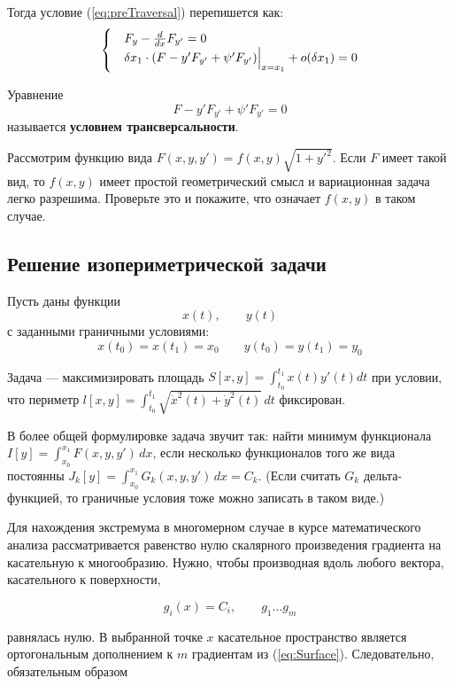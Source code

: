 \documentclass[12pt]{article}
\begin{document}
			Тогда условие (\ref{eq:preTraversal}) перепишется как:
			$$
				\begin{cases}
					&F_y - \frac{d}{dx} F_{y'} = 0 \\
					&\delta x_1 \cdot (F - y'F_{y'} + \psi' F_{y'})\Big|_{x=x_1}^{} + o(\delta x_1) = 0
				\end{cases} 
			$$

			Уравнение
			$$F - y' F_{y'} + \psi' F_{y'} = 0$$
			называется \textbf{условием трансверсальности}.


			\exc Рассмотрим функцию вида $F(x, y, y') = f(x,y) \sqrt{1+y'^2}$. Если $F$ имеет такой вид, то
			$f(x,y)$ имеет простой геометрический смысл и вариационная задача легко разрешима. Проверьте это
			и покажите, что означает $f(x,y)$ в таком случае.

	\subsection{Решение изопериметрической задачи}


		Пусть даны функции 
		$$x(t),\qquad y(t)$$
		с заданными граничными условиями:
		$$x(t_0) = x(t_1) = x_0 \qquad y(t_0) = y(t_1) = y_0$$

		Задача --- максимизировать площадь $S[x,y] = \int_{t_0}^{t_1}x(t)y'(t) dt$ при условии, что периметр
		$l[x,y] = \int_{t_0}^{t_1} \sqrt{\dot{x}^2(t) + \dot{y}^2(t)}\,dt$ фиксирован.

		В более общей формулировке задача звучит так: найти минимум функционала
		$I[y] = \int_{x_0}^{x_1} F(x,y,y')\,dx$, если несколько функционалов того же вида постоянны
		$J_k[y] = \int_{x_0}^{x_1} G_k(x,y,y')\,dx = C_k$. (Если считать $G_k$ дельта-функцией, то граничные
		условия тоже можно записать в таком виде.)

		Для нахождения экстремума в многомерном случае в курсе математического анализа рассматривается
		равенство нулю скалярного произведения градиента на касательную к многообразию. Нужно, чтобы
		производная вдоль любого вектора, касательного к поверхности,

		\begin{equation}g_i(x) = C_i, \qquad g_1\ldots g_m \label{eq:Surface}\end{equation}

		равнялась нулю. В выбранной точке $x$ касательное пространство является ортогональным дополнением
		к $m$ градиентам из (\ref{eq:Surface}). Следовательно, обязательным образом
		
\end{document}
